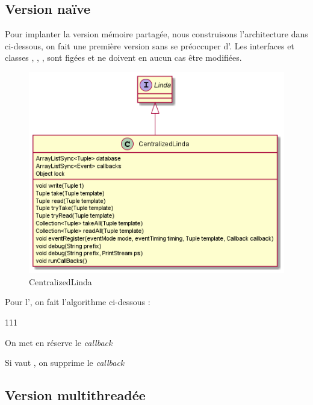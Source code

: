 \subsection{Version naïve}
Pour implanter la version mémoire partagée, nous construisons l'architecture dans
 ci-dessous, on fait une première version sans se préoccuper
d'. Les interfaces et classes , ,
,  sont figées et ne doivent en aucun cas être modifiées.


\begin{figure}[H]
    \centering
    \includegraphics[scale=0.7]{src/part-02/src/fig-2.png}
    \caption{CentralizedLinda} \label{fig:centralized-linda}
\end{figure}

Pour l', on fait l'algorithme ci-dessous :

\begin{dinglist}{111}
    \item On met en réserve le \textit{callback}
    \item Si  vaut , on supprime le \textit{callback}
\end{dinglist}


\subsection{Version multithreadée}
